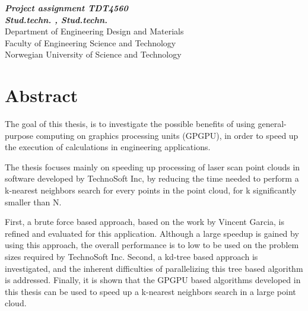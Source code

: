 \begin{center}
{\Large\bfseries \mytitle}
\end{center}

\begin{center}
{\bfseries\slshape Project assignment TDT4560}
\\[1.0cm]
{\bfseries\slshape
Stud.techn. \myauthorA, Stud.techn. \myauthorB \\}
Department of Engineering Design and Materials \\
Faculty of Engineering Science and Technology\\
Norwegian University of Science and Technology
\end{center}
\section*{Abstract}

The goal of this thesis, is to investigate the possible benefits of using general-purpose computing on graphics processing units (GPGPU), in order to speed up the execution of calculations in engineering applications.

The thesis focuses mainly on speeding up processing of laser scan point clouds in software developed by TechnoSoft Inc, by reducing the time needed to perform a k-nearest neighbors search for every points in the point cloud, for k significantly smaller than N.

First, a brute force based approach, based on the work by Vincent Garcia, is refined and evaluated for this application. Although a large speedup is gained by using this approach, the overall performance is to low to be used on the problem sizes required by TechnoSoft Inc. Second, a kd-tree based approach is investigated, and the inherent difficulties of parallelizing this tree based algorithm is addressed. Finally, it is shown that the GPGPU based algorithms developed in this thesis can be used to speed up a k-nearest neighbors search in a large point cloud.
